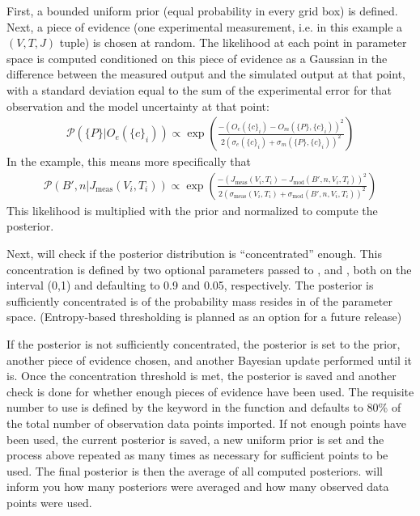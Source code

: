 \documentclass[letterpaper,10pt,english]{sphinxmanual}
\begin{document}
First, a bounded uniform prior (equal probability in every grid box) is defined. Next, a piece of evidence (one experimental measurement, i.e. in this example a \((V, T, J)\) tuple) is chosen at random. The likelihood at each point in parameter space is computed conditioned on this piece of evidence as a Gaussian in the difference between the measured output and the simulated output at that point, with a standard deviation equal to the sum of the experimental error for that observation and the model uncertainty at that point:
\begin{equation}\label{equation:manual:manual:0}
\begin{split}\mathcal{P}(\{P\}|O_e(\{c\}_i)) \propto \exp\left(\frac{-(O_e(\{c\}_i)-O_m(\{P\},\{c\}_i))^2}{2(\sigma_e(\{c\}_i)+\sigma_m(\{P\},\{c\}_i))^2}\right)\end{split}
\end{equation}
In the {\hyperref[\detokenize{examples:id}]{}} example, this means more specifically that
\begin{equation}\label{equation:manual:manual:1}
\begin{split}\mathcal{P}(B',n|J_{\text{meas}}(V_i,T_i)) \propto \exp\left(\frac{-(J_{\text{meas}}(V_i,T_i)-J_{\text{mod}}(B',n,V_i,T_i))^2}{2(\sigma_\text{meas}(V_i,T_i)+\sigma_{\text{mod}}(B',n,V_i,T_i))^2}\right)\end{split}
\end{equation}
This likelihood is multiplied with the prior and normalized to compute the posterior.

Next,  will check if the posterior distribution is “concentrated” enough. This concentration is defined by two optional parameters passed to ,  and , both on the interval (0,1) and defaulting to 0.9 and 0.05, respectively. The posterior is sufficiently concentrated is  of the probability mass resides in  of the parameter space. (Entropy-based thresholding is planned as an option for a future release)

If the posterior is not sufficiently concentrated, the posterior is set to the prior, another piece of evidence chosen, and another Bayesian update performed until it is. Once the concentration threshold is met, the posterior is saved and another check is done for whether enough pieces of evidence have been used. The requisite number to use is defined by the  keyword in the  function and defaults to 80\% of the total number of observation data points imported. If not enough points have been used, the current posterior is saved, a new uniform prior is set and the process above repeated as many times as necessary for sufficient points to be used. The final posterior is then the average of all computed posteriors.  will inform you how many posteriors were averaged and how many observed data points were used.
\end{document}
